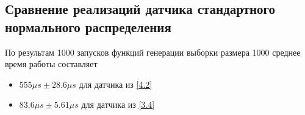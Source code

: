 \subsection{Сравнение реализаций датчика стандартного нормального распределения}
    По результам 1000 запусков функций генерации выборки размера 1000 среднее
    время работы составляет
    \begin{itemize}
        \item $555\mu s \pm 28.6 \mu s$ для датчика из \ref{4.2}
        \item $83.6\mu s \pm 5.61 \mu s$ для датчика из \ref{3.4}
    \end{itemize}
